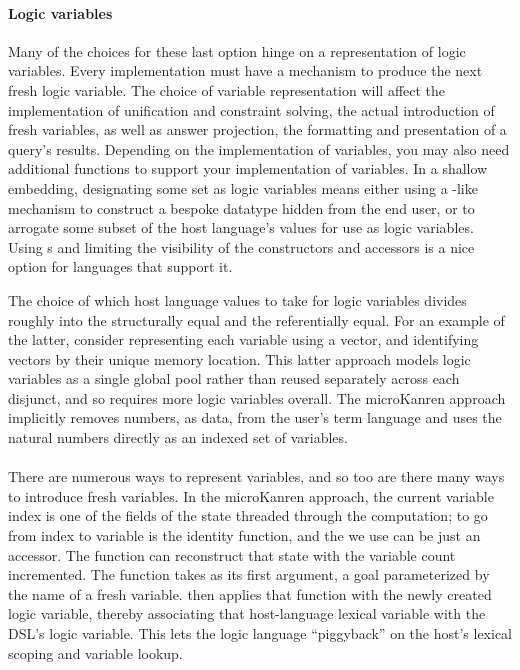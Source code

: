 \documentclass[sigplan,balance,pbalance,natbib=false]{acmart}
\begin{document}
\paragraph{Logic variables}

Many of the choices for these last option hinge on a representation of
logic variables. Every implementation must have a mechanism to produce
the next fresh logic variable. The choice of variable representation
will affect the implementation of unification and constraint solving,
the actual introduction of fresh variables, as well as answer
projection, the formatting and presentation of a query's results.
Depending on the implementation of variables, you may also need
additional functions to support your implementation of variables. In a
shallow embedding, designating some set as logic variables means
either using a -like mechanism to construct a
bespoke datatype hidden from the end user, or to arrogate some subset
of the host language's values for use as logic variables.
Using s and limiting the visibility of the
constructors and accessors is a nice option for languages that support
it.

The choice of which host language values to take for logic variables
divides roughly into the structurally equal and the referentially
equal. For an example of the latter, consider representing each
variable using a vector, and identifying vectors by their unique
memory location. This latter approach models logic variables as a
single global pool rather than reused separately across each disjunct,
and so requires more logic variables overall. The microKanren approach
implicitly removes numbers, as data, from the user's term language and
uses the natural numbers directly as an indexed set of variables.

\paragraph{}

There are numerous ways to represent variables, and so too are there
many ways to introduce fresh variables. In the microKanren approach,
the current variable index is one of the fields of the state threaded
through the computation; to go from index to variable is the identity
function, and the  we use can be just an
accessor. The function  can reconstruct that
state with the variable count incremented. The 
function takes as its first argument, a goal parameterized by the name
of a fresh variable.  then applies that
function with the newly created logic variable, thereby associating
that host-language lexical variable with the DSL's logic variable.
This lets the logic language \enquote{piggyback} on the host's lexical
scoping and variable lookup.
\end{document}
